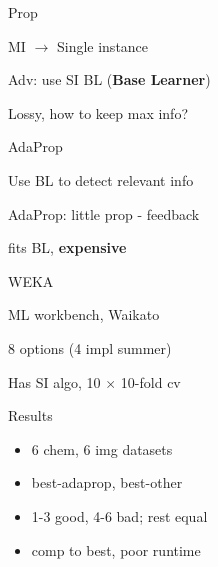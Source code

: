 \documentclass[13pt,handout]{beamer}
\newenvironment{wideitemize}{\itemize\addtolength{\itemsep}{20pt}}{\enditemize}
\begin{document}
\begin{frame}{Prop}
\begin{wideitemize}
    \item MI $\to$ Single instance
    \item Adv: use SI BL ({\bf Base Learner})
    \item Lossy, how to keep max info?
\end{wideitemize}
\end{frame}

\begin{frame}{AdaProp}
\begin{wideitemize}
    \item Use BL to detect relevant info
    \item AdaProp: little prop - feedback
    \item fits BL, {\bf expensive}
\end{wideitemize}
\end{frame}

\begin{frame}{WEKA}
\begin{wideitemize}
    \item ML workbench, Waikato
    \item 8 options (4 impl summer)
    \item Has SI algo, 10 $\times$ 10-fold cv
\end{wideitemize}
\end{frame}

\begin{frame}{Results}
\begin{itemize}
    \item 6 chem, 6 img datasets
    \item best-adaprop, best-other
    \item 1-3 good, 4-6 bad; rest equal
    \item comp to best, poor runtime
\end{itemize}
\end{frame}
\end{document}
